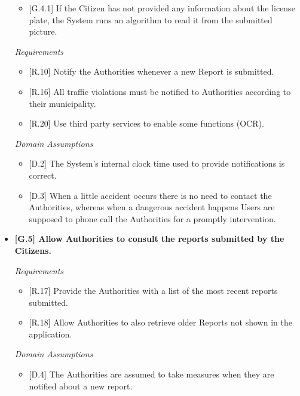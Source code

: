 \documentclass{report}
\begin{document}
\begin{itemize}
{		\begin{itemize}
			\item {[G.4.1]} If the Citizen has not provided any information about the license plate, the System runs an algorithm to read it from the submitted picture.
		\end{itemize}}
\begin{center}\large{\textit{Requirements}}\end{center}
    \begin{itemize}
		\item {[R.10]}
		Notify the Authorities whenever a new Report is submitted. 
		\item {[R.16]} All traffic violations must be notified to Authorities according to their municipality.
		\item {[R.20]}
		Use third party services to enable some functions (OCR).
	\end{itemize}
\begin{center}\large{\textit{Domain Assumptions}}\end{center}
	\begin{itemize}
		\item {[D.2]} The System's internal clock time used to provide notifications is correct.
		\item {[D.3]}
		 When a little accident occurs there is no need to contact the Authorities, whereas when a dangerous accident happens Users are supposed to phone call the Authorities for a promptly intervention.
	\end{itemize}
	\vspace{3mm} 
	\item \textbf{{[G.5]} Allow Authorities to consult the reports submitted by the Citizens.}
\begin{center}\large{\textit{Requirements}}\end{center}
	\begin{itemize}
		\item {[R.17]} Provide the Authorities with a list of the most recent reports submitted.
		\item {[R.18]} Allow Authorities to also retrieve older Reports not shown in the application.
	\end{itemize}
\begin{center}\large{\textit{Domain Assumptions}}\end{center}
	\begin{itemize}
		\item {[D.4]} The Authorities are assumed to take measures when they are notified about a new report.

\end{itemize}
\end{itemize}
\end{document}
